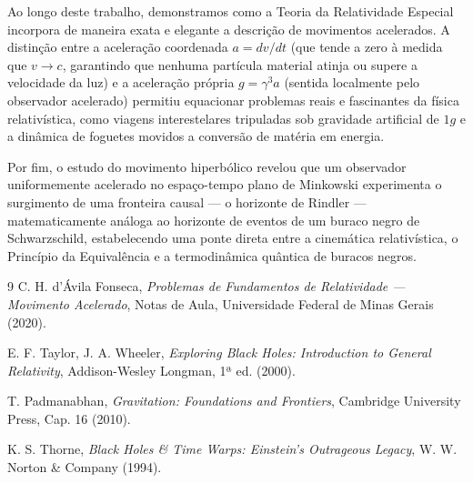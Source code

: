 \documentclass[11pt, a4paper]{article}
\begin{document}
Ao longo deste trabalho, demonstramos como a Teoria da Relatividade Especial incorpora de maneira exata e elegante a descrição de movimentos acelerados. A distinção entre a aceleração coordenada $a = dv/dt$ (que tende a zero à medida que $v \to c$, garantindo que nenhuma partícula material atinja ou supere a velocidade da luz) e a aceleração própria $g = \gamma^3 a$ (sentida localmente pelo observador acelerado) permitiu equacionar problemas reais e fascinantes da física relativística, como viagens interestelares tripuladas sob gravidade artificial de $1g$ e a dinâmica de foguetes movidos a conversão de matéria em energia.

Por fim, o estudo do movimento hiperbólico revelou que um observador uniformemente acelerado no espaço-tempo plano de Minkowski experimenta o surgimento de uma fronteira causal — o horizonte de Rindler — matematicamente análoga ao horizonte de eventos de um buraco negro de Schwarzschild, estabelecendo uma ponte direta entre a cinemática relativística, o Princípio da Equivalência e a termodinâmica quântica de buracos negros.

\begin{thebibliography}{9}
C. H. d'Ávila Fonseca, \textit{Problemas de Fundamentos de Relatividade — Movimento Acelerado}, Notas de Aula, Universidade Federal de Minas Gerais (2020).

E. F. Taylor, J. A. Wheeler, \textit{Exploring Black Holes: Introduction to General Relativity}, Addison-Wesley Longman, 1ª ed. (2000).

T. Padmanabhan, \textit{Gravitation: Foundations and Frontiers}, Cambridge University Press, Cap. 16 (2010).

K. S. Thorne, \textit{Black Holes \& Time Warps: Einstein's Outrageous Legacy}, W. W. Norton \& Company (1994).
\end{thebibliography}
\end{document}
